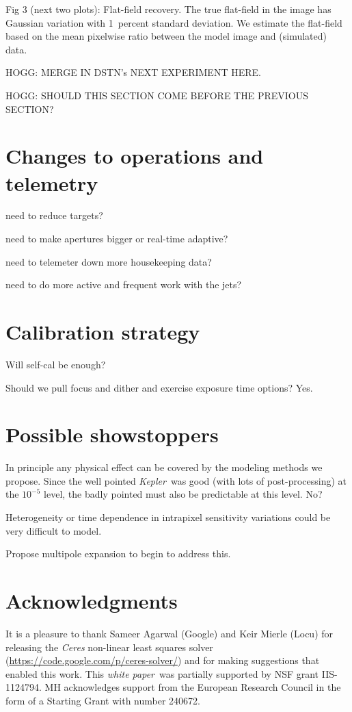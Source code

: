 \documentclass[letterpaper,12pt,preprint]{aastex}
\newcommand{\documentname}{\textsl{white paper}}
\newcommand{\observatory}[1]{\textsl{#1}}
\newcommand{\Kepler}{\observatory{Kepler}}
\newcommand{\project}[1]{\textsl{#1}}
\newcounter{address}
\begin{document}
Fig 3 (next two plots): Flat-field recovery.  The true flat-field in the image has Gaussian variation with 1~percent standard deviation.  We estimate the flat-field based on the mean pixelwise ratio between the model image and (simulated) data.

HOGG: MERGE IN DSTN's NEXT EXPERIMENT HERE.

HOGG: SHOULD THIS SECTION COME BEFORE THE PREVIOUS SECTION?

\section{Changes to operations and telemetry}\label{sec:operations}

need to reduce targets?

need to make apertures bigger or real-time adaptive?

need to telemeter down more housekeeping data?

need to do more active and frequent work with the jets?

\section{Calibration strategy}\label{sec:calibration}

Will self-cal be enough?

Should we pull focus and dither and exercise exposure time options?  Yes.

\section{Possible showstoppers}\label{sec:stop}

In principle any physical effect can be covered by the modeling
  methods we propose.
Since the well pointed \Kepler\ was good (with lots of post-processing)
  at the $10^{-5}$ level,
  the badly pointed must also be predictable at this level.  No?

Heterogeneity or time dependence in intrapixel sensitivity variations
could be very difficult to model.

Propose multipole expansion to begin to address this.

\section{Acknowledgments}

It is a pleasure to thank Sameer Agarwal (Google) and Keir Mierle
(Locu) for releasing the \project{Ceres} non-linear least squares
solver (\url{https://code.google.com/p/ceres-solver/}) and for making
suggestions that enabled this work.  This \documentname\ was partially
supported by NSF grant IIS-1124794. MH acknowledges support from the
European Research Council in the form of a Starting Grant with number
240672.
\end{document}
